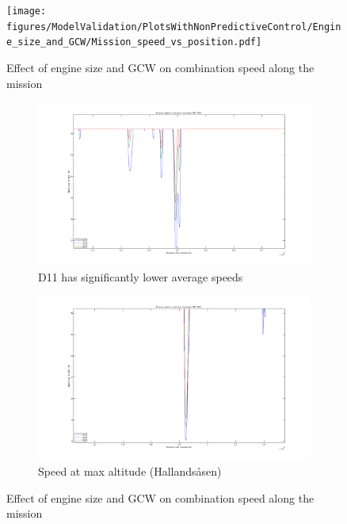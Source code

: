 \documentclass[ExampleMasters.tex]{subfiles}
\begin{document}
\begin{figure}[h!]
\centering
\texttt{[image: figures/ModelValidation/PlotsWithNonPredictiveControl/Engine\_size\_and\_GCW/Mission\_speed\_vs\_position.pdf]}
\caption{Effect of engine size and GCW on combination speed along the mission}
\label{missionSpeedEngineSizeGCW}
\end{figure}
\begin{figure}[h!]
\begin{subfigure}{.5\textwidth}
\centering
\includegraphics[width=\linewidth]{figures/ModelValidation/PlotsWithNonPredictiveControl/Engine_size_and_GCW/MissionSpeed80tZoomed.png}
\caption{D11 has significantly lower average speeds}
\end{subfigure}
\begin{subfigure}{.5\textwidth}
\centering
\includegraphics[width=\linewidth]{figures/ModelValidation/PlotsWithNonPredictiveControl/Engine_size_and_GCW/MissionSpeed80tZoomedMaxGradient.png}
\caption{Speed at max altitude (Hallands\aa sen)}
\end{subfigure}
\caption{Effect of engine size and GCW on combination speed along the mission}
\label{zoomedMissionSpeedEngineSizeGCW}
\end{figure}
\end{document}
